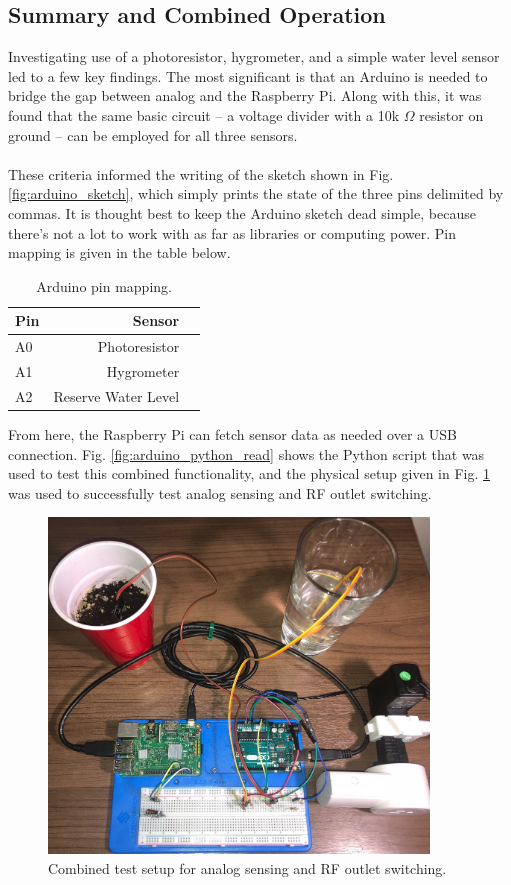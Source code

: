 \documentclass[]{article}
\begin{document}
\subsection{Summary and Combined Operation}
Investigating use of a photoresistor, hygrometer, and a simple water level sensor led to a few key findings.  The most significant is that an Arduino is needed to bridge the gap between analog and the Raspberry Pi.  Along with this, it was found that the same basic circuit -- a voltage divider with a 10k $\Omega$ resistor on ground -- can be employed for all three sensors.
\\\\
These criteria informed the writing of the sketch shown in Fig. \ref{fig:arduino_sketch}, which simply prints the state of the three pins delimited by commas.  It is thought best to keep the Arduino sketch dead simple, because there's not a lot to work with as far as libraries or computing power.  Pin mapping is given in the table below.

\begin{table}[h]
	\centering
	\caption{Arduino pin mapping.}
	\begin{tabular}{l|r|r}
		\textbf{Pin} & \textbf{Sensor} \\ \hline
		A0 & Photoresistor \\ \hline
		A1 & Hygrometer \\ \hline
		A2 & Reserve Water Level
	\end{tabular}	
\end{table}

From here, the Raspberry Pi can fetch sensor data as needed over a USB connection.  Fig. \ref{fig:arduino_python_read} shows the Python script that was used to test this combined functionality, and the physical setup given in Fig. \ref{fig:combined_test_circuit} was used to successfully test analog sensing and RF outlet switching.

\begin{figure}[h]
	\centering
	\includegraphics[width=0.9\textwidth]{combined_test_circuit}
	\caption{Combined test setup for analog sensing and RF outlet switching.}
	\label{fig:combined_test_circuit}
\end{figure}
\end{document}
